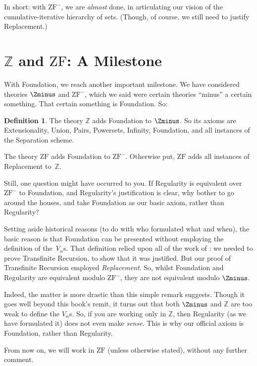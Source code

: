 \documentclass[10pt,a4paper]{article}
\makeatletter
\theoremstyle{plain}
\theoremstyle{definition}
\newtheorem{defn}[thm]{Definition}
\theoremstyle{remark}
\newcommand*{\olfileid}[3]{}
\newcommand*{\olsection}[1]{\section*{#1}}
\newcommand{\olref}{\@ifnextchar[{\olref@i}{\olref@final}}
\def\olref@i[#1]{\@ifnextchar[{\olref@ii}{\olref@final}}
\def\olref@ii[#1]{\@ifnextchar[{\olref@iii}{\olref@final}}
\def\olref@iii[#1]{\olref@final}
\def\olref@final#1{\ref{#1}}
\providecommand{\ZF}{\mathrm{ZF}}
\providecommand{\Z}{\mathbb{Z}}
\providecommand{\ZFminus}{\mathrm{ZF}^{-}}
\makeatother
\begin{document}
In short: with $\ZFminus$, we are \emph{almost} done, in articulating
our vision of the cumulative-iterative hierarchy of sets. (Though, of
course, we still need to justify Replacement.)



\olfileid{sth}{spine}{zf}
\olsection{$\Z$ and $\ZF$: A Milestone}

With Foundation, we reach another important milestone. We have
considered theories $\Zminus$ and $\ZFminus$, which we said were
certain theories ``minus'' a certain something. That certain something
is Foundation. So:

\begin{defn}
The theory $\Z$ adds Foundation to $\Zminus$. So its axioms are
Extensionality, Union, Pairs, Powersets, Infinity, Foundation, and all
instances of the Separation scheme.

The theory $\ZF$ adds Foundation to $\ZFminus$. Otherwise put, $\ZF$
adds all instances of Replacement to~$\Z$.
\end{defn}

Still, one question might have occurred to you. If Regularity is
equivalent over $\ZFminus$ to Foundation, and Regularity's
justification is clear, why bother to go around the houses, and take
Foundation as our basic axiom, rather than Regularity? 

Setting aside historical reasons (to do with who formulated what and
when), the basic reason is that Foundation can be presented without
employing the definition of the~$V_\alpha$s. That definition relied
upon all of the work of \olref[recursion]{sec}: we
needed to prove Transfinite Recursion, to show that it was justified.
But our proof of Transfinite Recursion employed \emph{Replacement}.
So, whilst Foundation and Regularity are equivalent modulo $\ZFminus$,
they are not equivalent modulo $\Zminus$. 

Indeed, the matter is more drastic than this simple remark suggests.
Though it goes well beyond this book's remit, it turns out that both
$\Zminus$ and $\Z$ are too weak to define the $V_\alpha$s. So, if you
are working only in $\Z$, then Regularity (as we have formulated it)
does not even make \emph{sense}. This is why our official axiom is
Foundation, rather than Regularity. 

From now on, we will work in $\ZF$ (unless otherwise stated), without
any further comment. 
\end{document}
